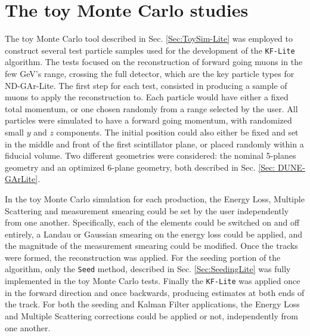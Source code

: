 \section{The toy Monte Carlo studies}
\label{Sec:ToyMCTests-Lite}
The toy Monte Carlo tool described in Sec. \ref{Sec:ToySim-Lite} was employed to construct several test particle samples used for the development of the \texttt{KF-Lite} algorithm. The tests focused on the reconstruction of forward going muons in the few GeV's range, crossing the full detector, which are the key particle types for ND-GAr-Lite. The first step for each test, consisted in producing a sample of muons to apply the reconstruction to. Each particle would have either a fixed total momentum, or one chosen randomly from a range selected by the user. All particles were simulated to have a forward going momentum, with randomized small $y$ and $z$ components. The initial position could also either be fixed and set in the middle and front of the first scintillator plane, or placed randomly within a fiducial volume. Two different geometries were considered: the nominal 5-planes geometry and an optimized 6-plane geometry, both described in Sec. \ref{Sec: DUNE-GArLite}.

In the toy Monte Carlo simulation for each production, the Energy Loss, Multiple Scattering and measurement smearing could be set by the user independently from one another. Specifically, each of the elements could be switched on and off entirely, a Landau or Gaussian smearing on the energy loss could be applied, and the magnitude of the measurement smearing could be modified. Once the tracks were formed, the reconstruction was applied. For the seeding portion of the algorithm, only the \texttt{Seed} method, described in  Sec. \ref{Sec:SeedingLite} was fully implemented in the toy Monte Carlo tests. Finally the \texttt{KF-Lite} was applied once in the forward direction and once backwards, producing estimates at both ends of the track. For both the seeding and Kalman Filter applications, the Energy Loss and Multiple Scattering corrections could be applied or not, independently from one another. 

